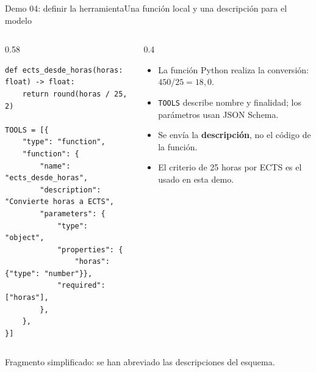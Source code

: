 \begin{frame}[fragile]{Demo 04: definir la herramienta}{Una función local y una descripción para el modelo}
	\begin{columns}[T]
		\begin{column}{0.58\textwidth}
			\begin{lstlisting}
def ects_desde_horas(horas: float) -> float:
    return round(horas / 25, 2)

TOOLS = [{
    "type": "function",
    "function": {
        "name": "ects_desde_horas",
        "description": "Convierte horas a ECTS",
        "parameters": {
            "type": "object",
            "properties": {
                "horas": {"type": "number"}},
            "required": ["horas"],
        },
    },
}]
\end{lstlisting}
		\end{column}
		\begin{column}{0.4\textwidth}
			\footnotesize
			\begin{itemize}
				\item La función Python realiza la conversión: $450 / 25 = 18{,}0$.
				\item \texttt{TOOLS} describe nombre y finalidad; los parámetros usan JSON Schema.
				\item Se envía la \textbf{descripción}, no el código de la función.
				\item El criterio de 25 horas por ECTS es el usado en esta demo.
			\end{itemize}
		\end{column}
	\end{columns}
	{\scriptsize Fragmento simplificado: se han abreviado las descripciones del esquema.}
\end{frame}

